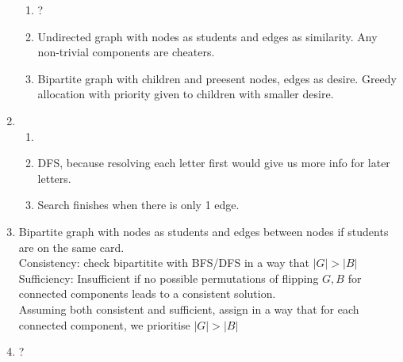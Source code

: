 \documentclass[12pt, a4paper]{article}
\begin{document}
\begin{enumerate}[Q\arabic*.]
\begin{enumerate}[(\alph*.)]
      \item ?

      \item Undirected graph with nodes as students and edges as similarity. Any non-trivial components are cheaters.

      \item Bipartite graph with children and preesent nodes, edges as desire. Greedy allocation with priority given to children with smaller desire.
    \end{enumerate}

  \item 
    \begin{enumerate}[(\alph*.)]
      \item 

      \item DFS, because resolving each letter first would give us more info for later letters.

      \item Search finishes when there is only 1 edge.
    \end{enumerate}

  \item Bipartite graph with nodes as students and edges between nodes if students are on the same card.\\
    Consistency: check bipartitite with BFS/DFS in a way that $|G| > |B|$\\
    Sufficiency: Insufficient if no possible permutations of flipping $G, B$ for connected components leads to a consistent solution.\\
    Assuming both consistent and sufficient, assign in a way that for each connected component, we prioritise $|G| > |B|$

  \item ?
\end{enumerate}
\end{document}

